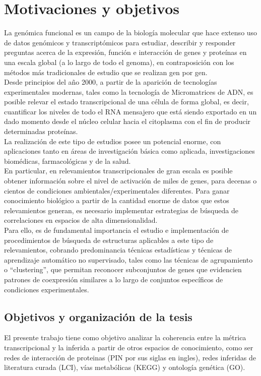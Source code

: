 \chapter*{Motivaciones y objetivos}
La genómica funcional es un campo de la biología molecular que hace extenso uso de datos genómicos y transcriptómicos para estudiar, describir y responder preguntas acerca de la expresión, función e interacción de genes y proteínas en una escala global (a lo largo de todo el genoma), en contraposición con los métodos más tradicionales de estudio que se realizan gen por gen.\\
Desde principios del año 2000, a partir de la aparición de tecnologías experimentales modernas, tales como la tecnología de Micromatrices de ADN, es posible relevar el estado transcripcional de una célula de forma global, es decir, cuantificar los niveles de todo el RNA mensajero que está siendo exportado en un dado momento desde el núcleo celular hacia el citoplasma con el fin de producir determinadas proteínas.\\
La realización de este tipo de estudios posee un potencial enorme, con aplicaciones tanto en áreas de investigación básica como aplicada, investigaciones biomédicas, farmacológicas y de la salud.\\
En particular, en relevamientos transcripcionales de gran escala es posible obtener información sobre el nivel de activación de miles de genes, para decenas o cientos de condiciones ambientales/experimentales diferentes. Para ganar conocimiento biológico a partir de la cantidad enorme de datos que estos relevamientos generan, es necesario implementar estrategias de búsqueda de correlaciones en espacios de alta dimensionalidad.\\
Para ello, es de fundamental importancia el estudio e implementación de procedimientos de búsqueda de estructuras aplicables a este tipo de relevamientos, cobrando predominancia técnicas estadísticas y técnicas de aprendizaje automático no supervisado, tales como las técnicas de agrupamiento o ``clustering'', que permitan reconocer subconjuntos de genes que evidencien patrones de coexpresión similares a lo largo de conjuntos específicos de condiciones experimentales.\cite{functional_genomics_definition_nature, functional_genomics_definition_wikipedia}

\section*{Objetivos y organización de la tesis}
El presente trabajo tiene como objetivo analizar la coherencia entre la métrica transcripcional y la inferida a partir de otros espacios de conocimiento, como ser redes de interacción de proteinas (PIN por sus siglas en ingles), redes inferidas de literatura curada (LCI), vías metabólicas (KEGG) y ontología genética (GO).

